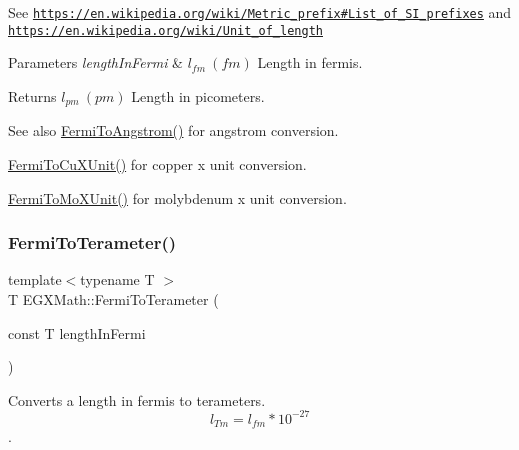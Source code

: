 See \href{https://en.wikipedia.org/wiki/Metric_prefix#List_of_SI_prefixes}{\tt https\+://en.\+wikipedia.\+org/wiki/\+Metric\+\_\+prefix\#\+List\+\_\+of\+\_\+\+S\+I\+\_\+prefixes} and \href{https://en.wikipedia.org/wiki/Unit_of_length}{\tt https\+://en.\+wikipedia.\+org/wiki/\+Unit\+\_\+of\+\_\+length} 
\begin{DoxyParams}{Parameters}
{\em length\+In\+Fermi} & $ l_{fm}\ (fm)$ Length in fermis. \\
\hline
\end{DoxyParams}
\begin{DoxyReturn}{Returns}
$ l_{pm}\ (pm)$ Length in picometers. 
\end{DoxyReturn}
\begin{DoxySeeAlso}{See also}
\mbox{\hyperlink{group___e_g_x_math-_conversions-_length_conversions-_non-_s_i-_fermi-_non-_s_i_ga9bec1d5936dfd3fa360cf3484685cc23}{Fermi\+To\+Angstrom()}} for angstrom conversion. 

\mbox{\hyperlink{group___e_g_x_math-_conversions-_length_conversions-_non-_s_i-_fermi-_non-_s_i_ga8c0963430e8fec7c613543844bd80064}{Fermi\+To\+Cu\+X\+Unit()}} for copper x unit conversion. 

\mbox{\hyperlink{group___e_g_x_math-_conversions-_length_conversions-_non-_s_i-_fermi-_non-_s_i_ga8555a46e14c4a759e0b04a54485d679e}{Fermi\+To\+Mo\+X\+Unit()}} for molybdenum x unit conversion. 
\end{DoxySeeAlso}
\mbox{\label{group___e_g_x_math-_conversions-_length_conversions-_non-_s_i-_fermi-_s_i_gaeec616a22461720c918d6dc60c3d7fbb}} 
\subsubsection{\texorpdfstring{Fermi\+To\+Terameter()}{FermiToTerameter()}}
{\footnotesize\ttfamily template$<$typename T $>$ \\
T E\+G\+X\+Math\+::\+Fermi\+To\+Terameter (\begin{DoxyParamCaption}\item[{const T}]{length\+In\+Fermi }\end{DoxyParamCaption})}



Converts a length in fermis to terameters. \[ l_{Tm}=l_{fm} * 10^{-27} \]. 

